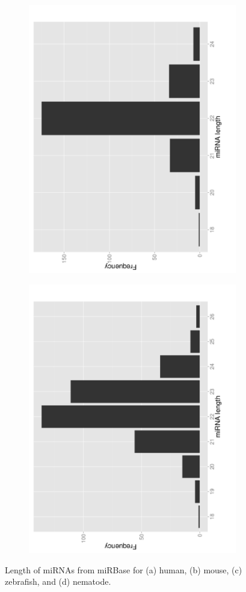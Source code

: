 \documentclass{article}
\begin{document}
\begin{figure}[t]
\begin{subfigure}{.5\textwidth}
      \caption{}
      \label{fig:mouse_mirna_length}
   \end{subfigure}
   \begin{subfigure}{.5\columnwidth}
      \centering
      \includegraphics[width=.7\textwidth,natwidth=100,natheight=100,angle=270]{zebrafish_mirbase_length.pdf}
      \caption{}
      \label{fig:zebrafish_mirna_length}
   \end{subfigure}%
   \begin{subfigure}{.5\columnwidth}
      \centering
      \includegraphics[width=.7\textwidth,natwidth=100,natheight=100,angle=270]{celegans_mirbase_length.pdf}
      \caption{}
      \label{fig:celegans_mirna_length}
   \end{subfigure}
   \caption{Length of miRNAs from miRBase for (a) human, (b) mouse, (c) zebrafish, and (d) nematode.}
   \label{fig:mirna_length}
\end{figure}
\end{document}
